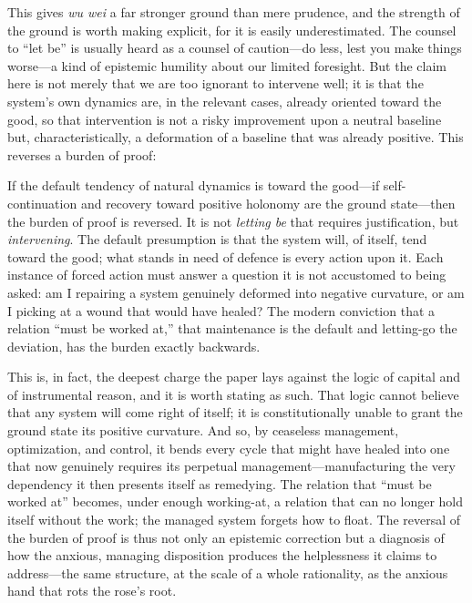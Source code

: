 This gives \emph{wu wei} a far stronger ground than mere prudence, and the strength of the ground is worth making explicit, for it is easily underestimated. The counsel to ``let be'' is usually heard as a counsel of caution---do less, lest you make things worse---a kind of epistemic humility about our limited foresight. But the claim here is not merely that we are too ignorant to intervene well; it is that the system's own dynamics are, in the relevant cases, already oriented toward the good, so that intervention is not a risky improvement upon a neutral baseline but, characteristically, a deformation of a baseline that was already positive. This reverses a burden of proof:

\begin{claim}
If the default tendency of natural dynamics is toward the good---if self-continuation and recovery toward positive holonomy are the ground state---then the burden of proof is reversed. It is not \emph{letting be} that requires justification, but \emph{intervening}. The default presumption is that the system will, of itself, tend toward the good; what stands in need of defence is every action upon it. Each instance of forced action must answer a question it is not accustomed to being asked: am I repairing a system genuinely deformed into negative curvature, or am I picking at a wound that would have healed? The modern conviction that a relation ``must be worked at,'' that maintenance is the default and letting-go the deviation, has the burden exactly backwards.
\end{claim}

This is, in fact, the deepest charge the paper lays against the logic of capital and of instrumental reason, and it is worth stating as such. That logic cannot believe that any system will come right of itself; it is constitutionally unable to grant the ground state its positive curvature. And so, by ceaseless management, optimization, and control, it bends every cycle that might have healed into one that now genuinely requires its perpetual management---manufacturing the very dependency it then presents itself as remedying. The relation that ``must be worked at'' becomes, under enough working-at, a relation that can no longer hold itself without the work; the managed system forgets how to float. The reversal of the burden of proof is thus not only an epistemic correction but a diagnosis of how the anxious, managing disposition produces the helplessness it claims to address---the same structure, at the scale of a whole rationality, as the anxious hand that rots the rose's root.

